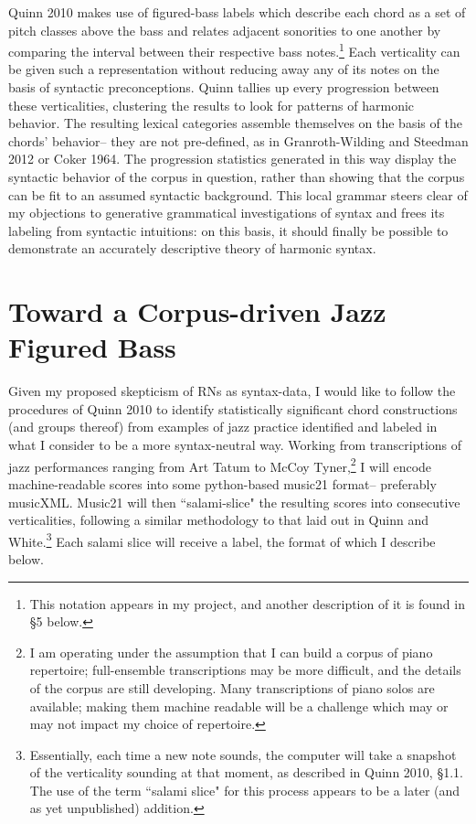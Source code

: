 Quinn 2010 makes use of figured-bass labels which describe each chord as a set of pitch classes above the bass and relates adjacent sonorities to one another by comparing the interval between their respective bass notes.\footnote{This notation appears in my project, and another description of it is found in \S 5 below.}  Each verticality can be given such a representation without reducing away any of its notes on the basis of syntactic preconceptions.  Quinn tallies up every progression between these verticalities, clustering the results to look for patterns of harmonic behavior.  The resulting lexical categories assemble themselves on the basis of the chords' behavior-- they are not pre-defined, as in Granroth-Wilding and Steedman 2012 or Coker 1964.  The progression statistics generated in this way display the syntactic behavior of the corpus in question, rather than showing that the corpus can be fit to an assumed syntactic background.  This local grammar steers clear of my objections to generative grammatical investigations of syntax and frees its labeling from syntactic intuitions: on this basis, it should finally be possible to demonstrate an accurately descriptive theory of harmonic syntax.

\section{Toward a Corpus-driven Jazz Figured Bass}

Given my proposed skepticism of RNs as syntax-data, I would like to follow the procedures of Quinn 2010 to identify statistically significant chord constructions (and groups thereof) from examples of jazz practice identified and labeled in what I consider to be a more syntax-neutral way.  Working from transcriptions of jazz performances ranging from Art Tatum to McCoy Tyner,\footnote{I am operating under the assumption that I can build a corpus of piano repertoire; full-ensemble transcriptions may be more difficult, and the details of the corpus are still developing.  Many transcriptions of piano solos are available; making them machine readable will be a challenge which may or may not impact my choice of repertoire.} I will encode machine-readable scores into some python-based music21 format-- preferably musicXML.  Music21 will then ``salami-slice" the resulting scores into consecutive verticalities, following a similar methodology to that laid out in Quinn and White.\footnote{Essentially, each time a new note sounds, the computer will take a snapshot of the verticality sounding at that moment, as described in Quinn 2010, \S 1.1.  The use of the term ``salami slice" for this process appears to be a later (and as yet unpublished) addition.}  Each salami slice will receive a label, the format of which I describe below.

